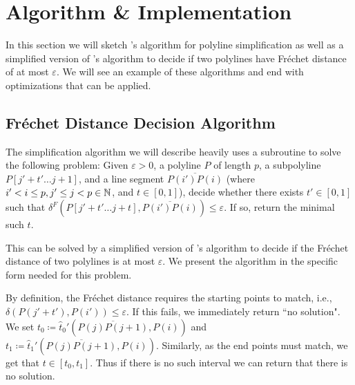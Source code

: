 \section{Algorithm \& Implementation}
\label{sec:algorithm_implementation}

In this section we will sketch \citeauthor{on_optimal_polyline_simplification_using_the_hausdorff_and_frechet_distance}'s algorithm for polyline simplification as well as a simplified version of \citeauthor{computing_the_frechet_distance_between_two_polygonal_curves}'s algorithm to decide if two polylines have Fréchet distance of at most \(\varepsilon\). We will see an example of these algorithms and end with optimizations that can be applied.

\subsection{Fréchet Distance Decision Algorithm}
\label{ssec:alt_godau}
The simplification algorithm we will describe heavily uses a subroutine to solve the following problem: Given \(\varepsilon > 0\), a polyline \(P\) of length \(p\), a subpolyline \(P[j' + t' \dots j+1]\), and a line segment \(\overline{P(i')P(i)}\) (where \(i' < i \leq p, j' \leq j < p\in \mathbb{N}\), and \(t \in [0, 1]\)), decide whether there exists \(t' \in [0, 1]\) such that \(\delta^F(P[j' + t' \dots j + t], \overline{P(i')P(i)}) \leq \varepsilon\). If so, return the minimal such \(t\).  

This can be solved by a simplified version of \citeauthor{computing_the_frechet_distance_between_two_polygonal_curves}'s algorithm to decide if the Fréchet distance of two polylines is at most \(\varepsilon\). We present the algorithm in the specific form needed for this problem. 

By definition, the Fréchet distance requires the starting points to match, i.e., \(\delta(P(j' + t'), P(i')) \leq \varepsilon\). If this fails, we immediately return ``no solution". We set \(t_0 \coloneq \hat t_0'(\overline{P(j)P(j+1)}, P(i))\) and \(t_1 \coloneq \hat t_1'(\overline{P(j)P(j+1)}, P(i))\). Similarly, as the end points must match, we get that \(t \in [t_0, t_1]\). Thus if there is no such interval we can return that there is no solution.

